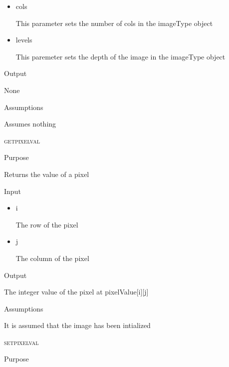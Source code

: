 \documentclass[pdftex, 11pt]{article}
\begin{document}
\begin{description}
\begin{description}
\begin{itemize}
					\item{cols}

						This parameter sets the number of cols
						in the imageType object

					\item{levels}

						This paremeter sets the depth of the
						image in the imageType object

				\end{itemize}

			\item{Output}

				None

			\item{Assumptions}

				Assumes nothing

		\end{description}




	\item{\textsc{getpixelval}}
		\begin{description}
			\item{Purpose}

				Returns the value of a pixel

			\item{Input}

				\begin{itemize}

					\item{i}
					
						The row of the pixel

					\item{j} 

						The column of the pixel

				\end{itemize}

			\item{Output}

				The integer value of the pixel at 
				pixelValue[i][j]


			\item{Assumptions}

				It is assumed that the image has been intialized


		\end{description}


	\item{\textsc{setpixelval}}
		\begin{description}
			\item{Purpose}


\end{description}
\end{description}
\end{document}
